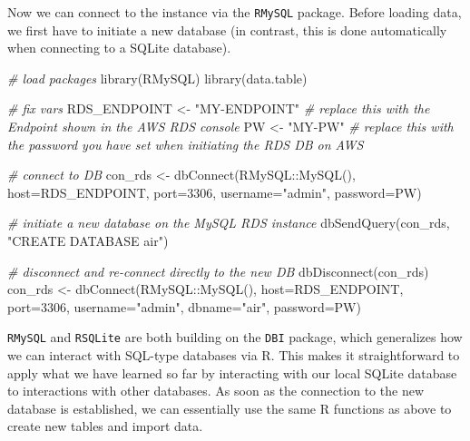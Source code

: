 \documentclass[
  12pt,
]{style/krantz}
\newenvironment{Shaded}{\begin{snugshade}}{\end{snugshade}}
\newcommand{\AttributeTok}[1]{\textcolor[rgb]{0.77,0.63,0.00}{#1}}
\newcommand{\CommentTok}[1]{\textcolor[rgb]{0.56,0.35,0.01}{\textit{#1}}}
\newcommand{\DecValTok}[1]{\textcolor[rgb]{0.00,0.00,0.81}{#1}}
\newcommand{\FunctionTok}[1]{\textcolor[rgb]{0.00,0.00,0.00}{#1}}
\newcommand{\NormalTok}[1]{#1}
\newcommand{\OtherTok}[1]{\textcolor[rgb]{0.56,0.35,0.01}{#1}}
\newcommand{\SpecialCharTok}[1]{\textcolor[rgb]{0.00,0.00,0.00}{#1}}
\newcommand{\StringTok}[1]{\textcolor[rgb]{0.31,0.60,0.02}{#1}}
\begin{document}
Now we can connect to the instance via the \texttt{RMySQL} package. Before loading data, we first have to initiate a new database (in contrast, this is done automatically when connecting to a SQLite database).

\begin{Shaded}
\begin{Highlighting}[]
\CommentTok{\# load packages}
\FunctionTok{library}\NormalTok{(RMySQL)}
\FunctionTok{library}\NormalTok{(data.table)}

\CommentTok{\# fix vars}
\NormalTok{RDS\_ENDPOINT }\OtherTok{\textless{}{-}} \StringTok{"MY{-}ENDPOINT"} \CommentTok{\# replace this with the Endpoint shown in the AWS RDS console}
\NormalTok{PW }\OtherTok{\textless{}{-}} \StringTok{"MY{-}PW"} \CommentTok{\# replace this with the password you have set when initiating the RDS DB on AWS}

\CommentTok{\# connect to DB}
\NormalTok{con\_rds }\OtherTok{\textless{}{-}} \FunctionTok{dbConnect}\NormalTok{(RMySQL}\SpecialCharTok{::}\FunctionTok{MySQL}\NormalTok{(),}
                 \AttributeTok{host=}\NormalTok{RDS\_ENDPOINT,}
                 \AttributeTok{port=}\DecValTok{3306}\NormalTok{,}
                 \AttributeTok{username=}\StringTok{"admin"}\NormalTok{,}
                 \AttributeTok{password=}\NormalTok{PW)}

\CommentTok{\# initiate a new database on the MySQL RDS instance}
\FunctionTok{dbSendQuery}\NormalTok{(con\_rds, }\StringTok{"CREATE DATABASE air"}\NormalTok{)}

\CommentTok{\# disconnect and re{-}connect directly to the new DB}
\FunctionTok{dbDisconnect}\NormalTok{(con\_rds)}
\NormalTok{con\_rds }\OtherTok{\textless{}{-}} \FunctionTok{dbConnect}\NormalTok{(RMySQL}\SpecialCharTok{::}\FunctionTok{MySQL}\NormalTok{(),}
                 \AttributeTok{host=}\NormalTok{RDS\_ENDPOINT,}
                 \AttributeTok{port=}\DecValTok{3306}\NormalTok{,}
                 \AttributeTok{username=}\StringTok{"admin"}\NormalTok{,}
                 \AttributeTok{dbname=}\StringTok{"air"}\NormalTok{,}
                 \AttributeTok{password=}\NormalTok{PW)}
\end{Highlighting}
\end{Shaded}

\texttt{RMySQL} and \texttt{RSQLite} are both building on the \texttt{DBI} package, which generalizes how we can interact with SQL-type databases via R. This makes it straightforward to apply what we have learned so far by interacting with our local SQLite database to interactions with other databases. As soon as the connection to the new database is established, we can essentially use the same R functions as above to create new tables and import data.
\end{document}
